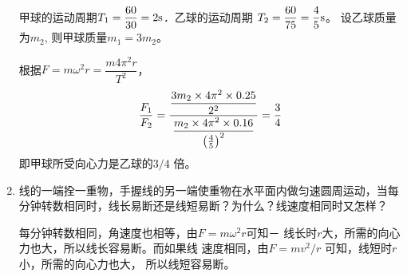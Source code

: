 \begin{enumerate}
\begin{solution}
    甲球的运动周期$T_1=\dfrac{60}{30}=2{\rm s}$．乙球的运动周期
    $T_2=\dfrac{60}{75}=\dfrac{4}{5}{\rm s}$。
设乙球质量为$m_2$, 则甲球质量$m_1=3m_2$。

    根据$F=m\omega^2 r=\dfrac{m4\pi^2 r}{T^2}$，
\[\frac{F_1}{F_2}=\frac{\dfrac{3m_2\times 4\pi^2\times 0.25}{2^2}}{\dfrac{m_2\times 4\pi^2\times 0.16}{\left(\frac{4}{5}\right)^2}}=\frac{3}{4}\]
    即甲球所受向心力是乙球的$3/4$
    倍。
\end{solution}
\item 线的一端拴一重物，手握线的另一端使重物在水平面内做匀速圆周运动，当每分钟转数相同时，线长易断还是线短易断？为什么？线速度相同时又怎样？

\begin{solution}
    每分钟转数相同，角速度也相等，由$F=m\omega^2r$可知－
    线长时$r$大，所需的向心力也大，所以线长容易断。而如果线
    速度相同，由$F=mv^2/r$
    可知，线短时$r$小，所需的向心力也大，
    所以线短容易断。
\end{solution}
\end{enumerate}




